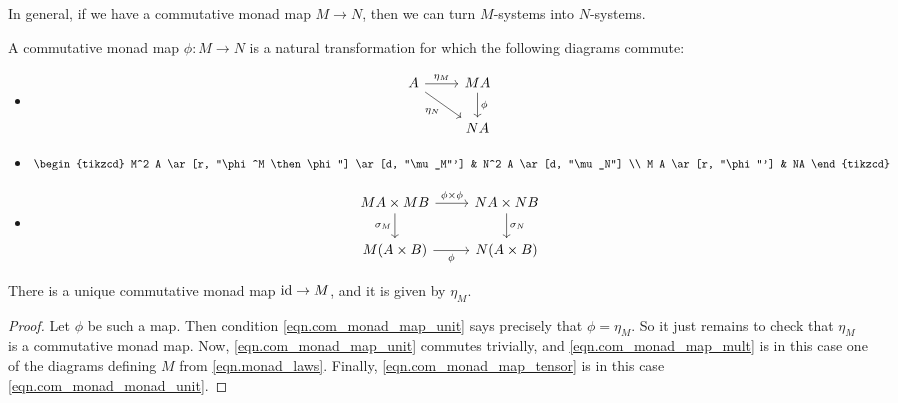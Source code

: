 \documentclass[DynamicalBook]{subfiles}
\begin{document}
In general, if we have a commutative monad map $M \to N$, then we can turn
$M$-systems into $N$-systems.

\begin{definition}\label{def.com_monad_map}
A commutative monad map $\phi : M \to N$ is a natural transformation for which
the following diagrams commute:
\begin{itemize}
\item
  \begin{equation}\label{eqn.com_monad_map_unit}
    \begin{tikzcd}
    A \ar[r, "\eta_M"] \ar[dr, "\eta_N"'] & M A \ar[d, "\phi"] \\
    & N A
    \end{tikzcd}
  \end{equation}
\item
  \begin{equation}\label{eqn.com_monad_map_mult}
    \begin{tikzcd}
    M^2 A \ar[r, "\phi^M \then \phi"] \ar[d, "\mu_M"'] & N^2 A \ar[d, "\mu_N"] \\
    M A \ar[r, "\phi"'] & NA
    \end{tikzcd}
  \end{equation}
\item
  \begin{equation}\label{eqn.com_monad_map_tensor}
    \begin{tikzcd}
    MA \times M B \ar[r, "\phi \times \phi"] \ar[d, "\sigma_M"'] & N A \times N B \ar[d, "\sigma_N"] \\
    M (A \times B) \ar[r, "\phi"'] & N(A \times B)
    \end{tikzcd}
  \end{equation}
\end{itemize}
\end{definition}



\begin{proposition}
  There is a unique commutative monad map $\mathrm{id} \to M$, and it is given by
  $\eta_M$. \end{proposition}
\begin{proof}
Let $\phi$ be such a map. Then condition \cref{eqn.com_monad_map_unit} says
precisely that $\phi = \eta_M$. So it just remains to check that $\eta_M$ is a commutative monad map.
  Now, \cref{eqn.com_monad_map_unit} commutes trivially, and
  \cref{eqn.com_monad_map_mult} is in this case one of the diagrams defining $M$
  from \cref{eqn.monad_laws}. Finally, \cref{eqn.com_monad_map_tensor} is in
  this case \cref{eqn.com_monad_monad_unit}.
\end{proof}
\end{document}
